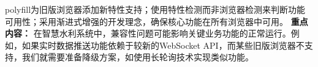 {polyfill为旧版浏览器添加新特性支持；使用特性检测而非浏览器检测来判断功能可用性；采用渐进式增强的开发理念，确保核心功能在所有浏览器中可用。 \textbf{重点内容：} 在智慧水利系统中，兼容性问题可能影响关键业务功能的正常运行。例如，如果实时数据推送功能依赖于较新的WebSocket API，而某些旧版浏览器不支持，我们就需要准备降级方案，如使用长轮询技术实现类似功能。 \hypertarget{ux7f51ux7edcux901aux4fe1ux4e0eux6570ux636eux4ea4ux6362}{%

}}
